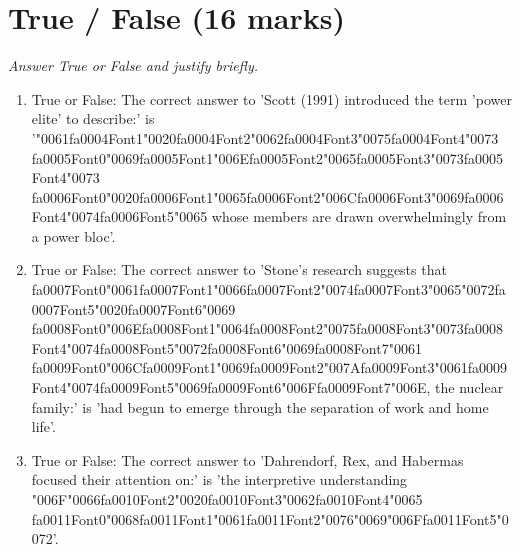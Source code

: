 \documentclass[12pt]{article}
\begin{document}
\section*{True / False (16 marks)}
\textit{Answer True or False and justify briefly.}
\begin{enumerate}[label=\arabic*.]
\item True or False: The correct answer to 'Scott (1991) introduced the term 'power elite' to describe:' is '{\char"0061}{\csname fa0004Font1\endcsname\char"0020}{\csname fa0004Font2\endcsname\char"0062}{\csname fa0004Font3\endcsname\char"0075}{\csname fa0004Font4\endcsname\char"0073} {\csname fa0005Font0\endcsname\char"0069}{\csname fa0005Font1\endcsname\char"006E}{\csname fa0005Font2\endcsname\char"0065}{\csname fa0005Font3\endcsname\char"0073}{\csname fa0005Font4\endcsname\char"0073} {\csname fa0006Font0\endcsname\char"0020}{\csname fa0006Font1\endcsname\char"0065}{\csname fa0006Font2\endcsname\char"006C}{\csname fa0006Font3\endcsname\char"0069}{\csname fa0006Font4\endcsname\char"0074}{\csname fa0006Font5\endcsname\char"0065} whose members are drawn overwhelmingly from a power bloc'.
\item True or False: The correct answer to 'Stone's research suggests that {\csname fa0007Font0\endcsname\char"0061}{\csname fa0007Font1\endcsname\char"0066}{\csname fa0007Font2\endcsname\char"0074}{\csname fa0007Font3\endcsname\char"0065}{\char"0072}{\csname fa0007Font5\endcsname\char"0020}{\csname fa0007Font6\endcsname\char"0069} {\csname fa0008Font0\endcsname\char"006E}{\csname fa0008Font1\endcsname\char"0064}{\csname fa0008Font2\endcsname\char"0075}{\csname fa0008Font3\endcsname\char"0073}{\csname fa0008Font4\endcsname\char"0074}{\csname fa0008Font5\endcsname\char"0072}{\csname fa0008Font6\endcsname\char"0069}{\csname fa0008Font7\endcsname\char"0061} {\csname fa0009Font0\endcsname\char"006C}{\csname fa0009Font1\endcsname\char"0069}{\csname fa0009Font2\endcsname\char"007A}{\csname fa0009Font3\endcsname\char"0061}{\csname fa0009Font4\endcsname\char"0074}{\csname fa0009Font5\endcsname\char"0069}{\csname fa0009Font6\endcsname\char"006F}{\csname fa0009Font7\endcsname\char"006E}, the nuclear family:' is 'had begun to emerge through the separation of work and home life'.
\item True or False: The correct answer to 'Dahrendorf, Rex, and Habermas focused their attention on:' is 'the interpretive understanding {\char"006F}{\char"0066}{\csname fa0010Font2\endcsname\char"0020}{\csname fa0010Font3\endcsname\char"0062}{\csname fa0010Font4\endcsname\char"0065} {\csname fa0011Font0\endcsname\char"0068}{\csname fa0011Font1\endcsname\char"0061}{\csname fa0011Font2\endcsname\char"0076}{\char"0069}{\char"006F}{\csname fa0011Font5\endcsname\char"0072}'.

\end{enumerate}
\end{document}
